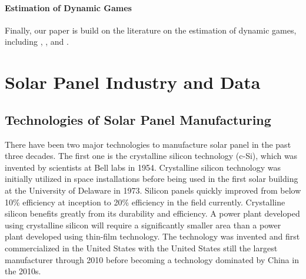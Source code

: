 \documentclass[12pt, letter]{article}
\begin{document}


\paragraph{Estimation of Dynamic Games}
Finally, our paper is build on the literature on the estimation of dynamic games, including \citet{bajari2007estimating}, \citet{ryan2012costs}, and \citet{sweeting2013dynamic}.

\section{Solar Panel Industry and Data}
\label{sec:institution_data}

\subsection{Technologies of Solar Panel Manufacturing}
\label{subsec:inst_PV_tech}

There have been two major technologies to manufacture solar panel in the past three decades.  The first one is the crystalline silicon technology (c-Si), which was invented by scientists at Bell labs in 1954. Crystalline silicon technology was initially utilized in space installations before being used in the first solar building at the University of Delaware in 1973. Silicon panels quickly improved from below 10\% efficiency at inception to 20\% efficiency in the field currently. Crystalline silicon benefits greatly from its durability and efficiency. A power plant developed using crystalline silicon will require a significantly smaller area than a power plant developed using thin-film technology. The technology was invented and first commercialized in the United States with the United States still the largest manufacturer through 2010 before becoming a technology dominated by China in the 2010s.
\end{document}
